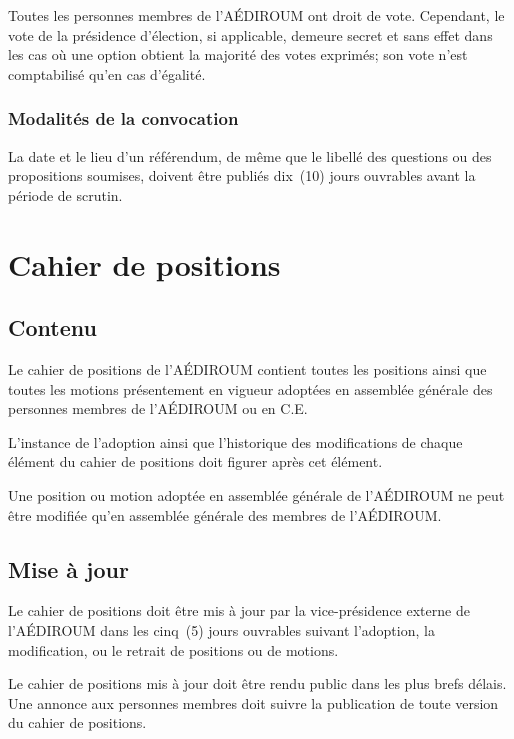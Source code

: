 \documentclass{aediroum}
\begin{document}
Toutes les personnes membres de l'AÉDIROUM ont droit de vote. Cependant, le vote de la présidence d'élection, si applicable, demeure secret et sans effet dans les cas où une option obtient la majorité des votes exprimés; son vote n'est comptabilisé qu'en cas d'égalité.

\subsubsection{Modalités de la convocation}\label{sec:modalites-convocation}

La date et le lieu d'un référendum, de même que le libellé des questions ou des propositions soumises, doivent être publiés dix~(10) jours ouvrables avant la période de scrutin.

\section{Cahier de positions}\label{sec:cahier-de-positions}

\subsection{Contenu}\label{sec:contenu-positions}

Le cahier de positions de l'AÉDIROUM contient toutes les positions ainsi que toutes les motions présentement en vigueur adoptées en assemblée générale des personnes membres de l'AÉDIROUM ou en C.E.

L'instance de l'adoption ainsi que l'historique des modifications de chaque élément du cahier de positions doit figurer après cet élément.

Une position ou motion adoptée en assemblée générale de l'AÉDIROUM ne peut être modifiée qu'en assemblée générale des membres de l'AÉDIROUM.

\subsection{Mise à jour}\label{sec:mise-a-jour-positions}

Le cahier de positions doit être mis à jour par la vice-présidence externe de l'AÉDIROUM dans les cinq~(5) jours ouvrables suivant l'adoption, la modification, ou le retrait de positions ou de motions.

Le cahier de positions mis à jour doit être rendu public dans les plus brefs délais. Une annonce aux personnes membres doit suivre la publication de toute version du cahier de positions.
\end{document}
